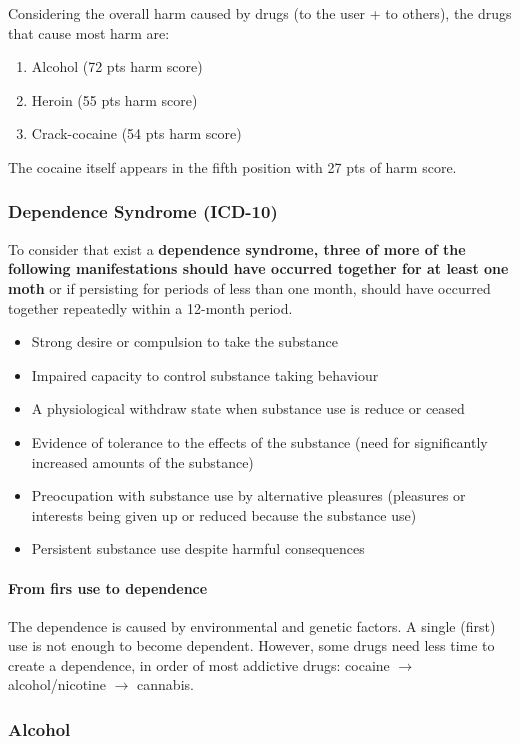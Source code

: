 \documentclass[12pt,article,oneside,a4paper]{memoir}
\begin{document}
Considering the overall harm caused by drugs (to the user + to others), the drugs that cause most harm are: 
\begin{enumerate}
\item Alcohol (72 pts harm score)
\item Heroin (55 pts harm score)
\item Crack-cocaine (54 pts harm score)
\end{enumerate}
The cocaine itself appears in the fifth position with 27 pts of harm score.

\subsubsection{Dependence Syndrome (ICD-10)} 
To consider that exist a \textbf{dependence syndrome, three of more of the following manifestations should have occurred together for at least one moth} or if persisting for periods of less than one month, should have occurred together repeatedly within a 12-month period.

\begin{itemize}
\item Strong desire or compulsion to take the substance
\item Impaired capacity to control substance taking behaviour
\item A physiological withdraw state when substance use is reduce or ceased
\item Evidence of tolerance to the effects of the substance (need for significantly increased amounts of the substance)
\item Preocupation with substance use by alternative pleasures (pleasures or interests being given up or reduced because the substance use)
\item Persistent substance use despite harmful consequences
\end{itemize}

\paragraph{From firs use to dependence} 
The dependence is caused by environmental and genetic factors. A single (first) use is not enough to become dependent.
However, some drugs need less time to create a dependence, in order of most addictive drugs: cocaine $\rightarrow$ alcohol/nicotine $\rightarrow$ cannabis.

\subsubsection{Alcohol}
\end{document}
